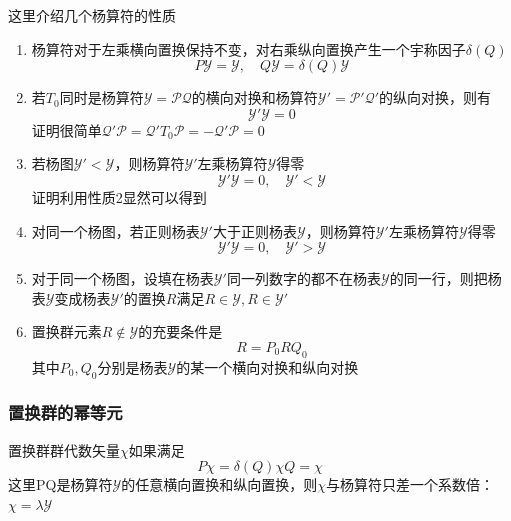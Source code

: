 \documentclass[12pt]{article}
\begin{document}
这里介绍几个杨算符的性质
\begin{enumerate}
    \item 杨算符对于左乘横向置换保持不变，对右乘纵向置换产生一个宇称因子$\delta(Q)$
    \begin{equation*}
        P\mathcal{Y}=\mathcal{Y},\quad Q\mathcal{Y}=\delta(Q)\mathcal{Y}
    \end{equation*}
    \item 若$T_0$同时是杨算符$\mathcal{Y}=\mathcal{PQ}$的横向对换和杨算符$\mathcal{Y}'=\mathcal{P}'\mathcal{Q}'$的纵向对换，则有
    \begin{equation*}
        \mathcal{Y}'\mathcal{Y}=0
    \end{equation*}
    证明很简单$\mathcal{Q}'\mathcal{P}=\mathcal{Q}'T_0\mathcal{P}=-\mathcal{Q}'\mathcal{P}=0$
    \item 若杨图$\mathcal{Y}'<\mathcal{Y}$，则杨算符$\mathcal{Y}'$左乘杨算符$\mathcal{Y}$得零
    \begin{equation*}
        \mathcal{Y}'\mathcal{Y}=0,\quad \mathcal{Y}'<\mathcal{Y}
    \end{equation*}
    证明利用性质2显然可以得到
    \item 对同一个杨图，若正则杨表$\mathcal{Y}'$大于正则杨表$\mathcal{Y}$，则杨算符$\mathcal{Y}'$左乘杨算符$\mathcal{Y}$得零
    \begin{equation*}
        \mathcal{Y}'\mathcal{Y}=0,\quad \mathcal{Y}'>\mathcal{Y}
    \end{equation*}
    \item 对于同一个杨图，设填在杨表$\mathcal{Y}'$同一列数字的都不在杨表$\mathcal{Y}$的同一行，则把杨表$\mathcal{Y}$变成杨表$\mathcal{Y}'$的置换$R$满足$R\in\mathcal{Y},R\in\mathcal{Y}'$
    \item 置换群元素$R\notin\mathcal{Y}$的充要条件是
    \begin{equation*}
        R=P_0RQ_0
    \end{equation*}
    其中$P_0,Q_0$分别是杨表$\mathcal{Y}$的某一个横向对换和纵向对换
\end{enumerate}
\subsubsection{置换群的幂等元}
置换群群代数矢量$\chi$如果满足
\begin{equation*}
    P\chi=\delta(Q)\chi Q=\chi
\end{equation*}
这里PQ是杨算符$\mathcal{Y}$的任意横向置换和纵向置换，则$\chi$与杨算符只差一个系数倍：$\chi=\lambda\mathcal{Y}$
\end{document}
